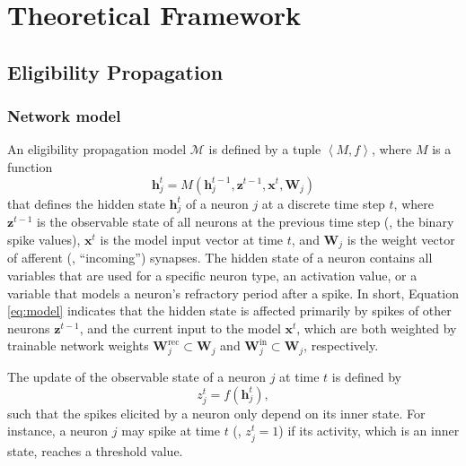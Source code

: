 \chapter{Theoretical Framework}\label{ch:relatedwork}

\section{Eligibility Propagation}

    \subsection{Network model}
        An eligibility propagation model $\mathcal{M}$ is defined by a tuple $\left<M, f\right>$,
        where $M$ is a function
        \begin{equation}\label{eq:model}
        \mathbf{h}^t_j = M\left(\mathbf{h}_j^{t-1}, \mathbf{z}^{t-1}, \mathbf{x}^t, \mathbf{W}_j\right)
        \end{equation}
        that defines the hidden state $\mathbf{h}_j^t$ of a neuron $j$ at a discrete time step $t$, where $\mathbf{z}^{t-1}$ is the observable state of all neurons at the previous time step (\ie, the binary spike values), $\mathbf{x}^t$ is the model input vector at time $t$, and $\mathbf{W}_j$ is the weight vector of afferent (\ie, ``incoming'') synapses.
        The hidden state of a neuron contains all variables that are used for a specific neuron type, \eg an activation value, or a variable that models a neuron's refractory period after a spike.
        In short, Equation \ref{eq:model} indicates that the hidden state is affected primarily by spikes of other neurons $\mathbf{z}^{t-1}$, and the current input to the model $\mathbf{x}^t$, which are both weighted by trainable network weights $\mathbf{W}^\text{rec}_j \subset \mathbf{W}_j$ and $\mathbf{W}^\text{in}_j \subset \mathbf{W}_j$, respectively.

        The update of the observable state of a neuron $j$ at time $t$ is defined by
        \begin{equation}
        z^t_j = f\left(\mathbf{h}_j^t\right),
        \end{equation}
        such that the spikes elicited by a neuron only depend on its inner state.
        For instance, a neuron $j$ may spike at time $t$ (\ie, $z^t_j = 1$) if its activity, which is an inner state, reaches a threshold value.


